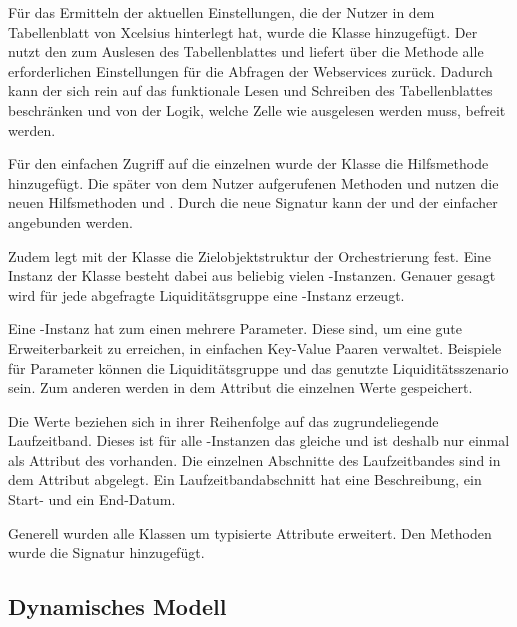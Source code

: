 \begin{onehalfspacing}
Für das Ermitteln der aktuellen Einstellungen, die der Nutzer in dem Tabellenblatt von \gls{Xcelsius} hinterlegt hat, wurde die Klasse  hinzugefügt. Der  nutzt den  zum Auslesen des Tabellenblattes und liefert über die Methode  alle erforderlichen Einstellungen für die Abfragen der Webservices zurück. Dadurch kann der  sich rein auf das funktionale Lesen und Schreiben des Tabellenblattes beschränken und von der Logik, welche Zelle wie ausgelesen werden muss, befreit werden.

Für den einfachen Zugriff auf die einzelnen  wurde der Klasse  die Hilfsmethode  hinzugefügt. Die später von dem Nutzer aufgerufenen Methoden  und  nutzen die neuen Hilfsmethoden  und . Durch die neue Signatur kann der  und der  einfacher angebunden werden.

\label{sec:entwurf:statisch:orchestratorresult}
Zudem legt mit der Klasse  die Zielobjektstruktur der Orchestrierung fest. Eine Instanz der Klasse  besteht dabei aus beliebig vielen -Instanzen. Genauer gesagt wird für jede abgefragte Liquiditätsgruppe eine -Instanz erzeugt.

Eine -Instanz hat zum einen mehrere Parameter. Diese sind, um eine gute Erweiterbarkeit zu erreichen, in einfachen Key-Value Paaren verwaltet. Beispiele für Parameter können die Liquiditätsgruppe und das genutzte Liquiditätsszenario sein. Zum anderen werden in dem Attribut  die einzelnen Werte gespeichert.

Die Werte beziehen sich in ihrer Reihenfolge auf das zugrundeliegende Laufzeitband. Dieses ist für alle -Instanzen das gleiche und ist deshalb nur einmal als Attribut des  vorhanden. Die einzelnen Abschnitte des Laufzeitbandes sind in dem Attribut  abgelegt. Ein Laufzeitbandabschnitt hat eine Beschreibung, ein Start- und ein End-Datum.

Generell wurden alle Klassen um typisierte Attribute erweitert. Den Methoden wurde die Signatur hinzugefügt.

\subsection{Dynamisches Modell}


\end{onehalfspacing}
